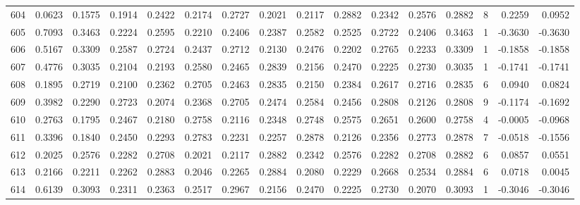 \begin{tabular}{lrrrrrrrrrrrrrrr}
604 &      0.0623 &  0.1575 &  0.1914 &  0.2422 &  0.2174 &  0.2727 &  0.2021 &  0.2117 &  0.2882 &  0.2342 &   0.2576 &     0.2882 &      8 &                    0.2259 &                     0.0952 \\
605 &      0.7093 &  0.3463 &  0.2224 &  0.2595 &  0.2210 &  0.2406 &  0.2387 &  0.2582 &  0.2525 &  0.2722 &   0.2406 &     0.3463 &      1 &                   -0.3630 &                    -0.3630 \\
606 &      0.5167 &  0.3309 &  0.2587 &  0.2724 &  0.2437 &  0.2712 &  0.2130 &  0.2476 &  0.2202 &  0.2765 &   0.2233 &     0.3309 &      1 &                   -0.1858 &                    -0.1858 \\
607 &      0.4776 &  0.3035 &  0.2104 &  0.2193 &  0.2580 &  0.2465 &  0.2839 &  0.2156 &  0.2470 &  0.2225 &   0.2730 &     0.3035 &      1 &                   -0.1741 &                    -0.1741 \\
608 &      0.1895 &  0.2719 &  0.2100 &  0.2362 &  0.2705 &  0.2463 &  0.2835 &  0.2150 &  0.2384 &  0.2617 &   0.2716 &     0.2835 &      6 &                    0.0940 &                     0.0824 \\
609 &      0.3982 &  0.2290 &  0.2723 &  0.2074 &  0.2368 &  0.2705 &  0.2474 &  0.2584 &  0.2456 &  0.2808 &   0.2126 &     0.2808 &      9 &                   -0.1174 &                    -0.1692 \\
610 &      0.2763 &  0.1795 &  0.2467 &  0.2180 &  0.2758 &  0.2116 &  0.2348 &  0.2748 &  0.2575 &  0.2651 &   0.2600 &     0.2758 &      4 &                   -0.0005 &                    -0.0968 \\
611 &      0.3396 &  0.1840 &  0.2450 &  0.2293 &  0.2783 &  0.2231 &  0.2257 &  0.2878 &  0.2126 &  0.2356 &   0.2773 &     0.2878 &      7 &                   -0.0518 &                    -0.1556 \\
612 &      0.2025 &  0.2576 &  0.2282 &  0.2708 &  0.2021 &  0.2117 &  0.2882 &  0.2342 &  0.2576 &  0.2282 &   0.2708 &     0.2882 &      6 &                    0.0857 &                     0.0551 \\
613 &      0.2166 &  0.2211 &  0.2262 &  0.2883 &  0.2046 &  0.2265 &  0.2884 &  0.2080 &  0.2229 &  0.2668 &   0.2534 &     0.2884 &      6 &                    0.0718 &                     0.0045 \\
614 &      0.6139 &  0.3093 &  0.2311 &  0.2363 &  0.2517 &  0.2967 &  0.2156 &  0.2470 &  0.2225 &  0.2730 &   0.2070 &     0.3093 &      1 &                   -0.3046 &                    -0.3046 \\

\end{tabular}
